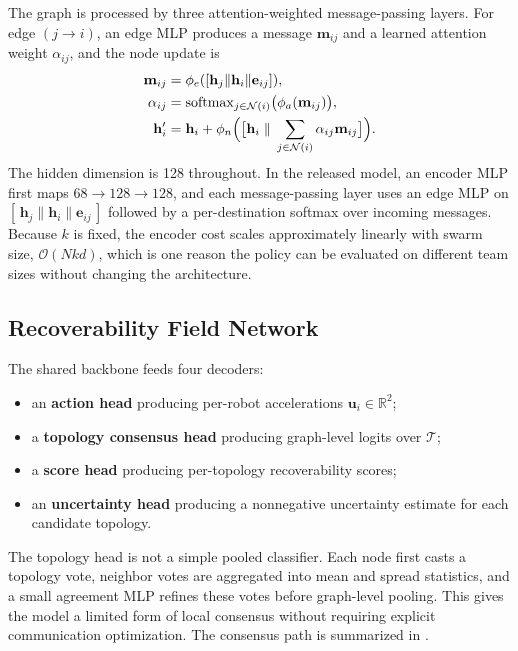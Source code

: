 \documentclass[journal]{IEEEtran}
\newcommand{\R}{\mathbb{R}}
\newcommand{\cN}{\mathcal{N}}
\newcommand{\cT}{\mathcal{T}}
\newcommand{\bfu}{\mathbf{u}}
\begin{document}
The graph is processed by three attention-weighted message-passing
layers. For edge $(j \rightarrow i)$, an edge MLP produces a message
$\mathbf{m}_{ij}$ and a learned attention weight $\alpha_{ij}$, and the
node update is
\begin{align}
\mathbf{m}_{ij} &= \phi_e([\mathbf{h}_j \| \mathbf{h}_i \|
\mathbf{e}_{ij}]), \\
\alpha_{ij} &= \operatorname{softmax}_{j \in \cN(i)}
\bigl(\phi_a(\mathbf{m}_{ij})\bigr), \\
\mathbf{h}_i' &= \mathbf{h}_i +
\phi_n\Bigl(\bigl[\mathbf{h}_i \;\|\;
\sum_{j\in\cN(i)}\alpha_{ij}\mathbf{m}_{ij}\bigr]\Bigr).
\end{align}
The hidden dimension is 128 throughout. In the released model, an
encoder MLP first maps $68 \rightarrow 128 \rightarrow 128$, and each
message-passing layer uses an edge MLP on
$[\,\mathbf{h}_j \| \mathbf{h}_i \| \mathbf{e}_{ij}\,]$ followed by a
per-destination softmax over incoming messages. Because $k$ is fixed,
the encoder cost scales approximately linearly with swarm size,
$\mathcal{O}(Nk d)$, which is one reason the policy can be evaluated on
different team sizes without changing the architecture.

\subsection{Recoverability Field Network}
\label{sec:rfn}

The shared backbone feeds four decoders:
\begin{itemize}
    \item an \textbf{action head} producing per-robot accelerations
    $\bfu_i \in \R^2$;
    \item a \textbf{topology consensus head} producing graph-level
    logits over $\cT$;
    \item a \textbf{score head} producing per-topology recoverability
    scores;
    \item an \textbf{uncertainty head} producing a nonnegative
    uncertainty estimate for each candidate topology.
\end{itemize}

The topology head is not a simple pooled classifier. Each node first
casts a topology vote, neighbor votes are aggregated into mean and
spread statistics, and a small agreement MLP refines these votes before
graph-level pooling. This gives the model a limited form of local
consensus without requiring explicit communication optimization. The
consensus path is summarized in .
\end{document}
